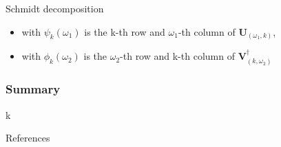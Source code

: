 \documentclass{beamer}
\begin{document}
\begin{frame}{Schmidt decomposition}
    \begin{itemize}
        \item with $ \psi_k(\omega_1) $ is the k-th row and $\omega_1$-th column of $\textbf{U}_{(\omega_1, k)}$,
        \item with $ \phi_k(\omega_2) $ is the $\omega_2$-th row and k-th column of $\textbf{V}^\dagger_{(k,\omega_2)}$
    \end{itemize}
\end{frame}

\begin{frame}
\frametitle{Summary}
k
\end{frame}

\begin{frame}{References}


\end{frame}
\end{document}

